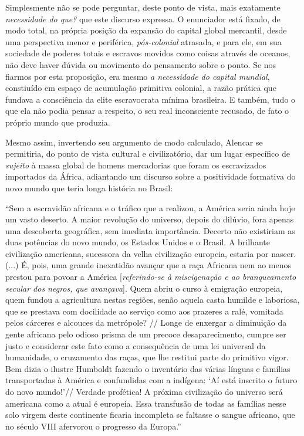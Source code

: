 Simplesmente não se pode perguntar, deste ponto de vista, mais
exatamente \emph{necessidade do que?} que este discurso expressa. O
enunciador está fixado, de modo total, na própria posição da expansão do
capital global mercantil, desde uma perspectiva menor e periférica,
\emph{pós-colonial} atrasada, e para ele, em sua sociedade de poderes
totais e escravos movidos como coisas através de oceanos, não deve haver
dúvida ou movimento do pensamento sobre o ponto. Se nos fiarmos por esta
proposição, era mesmo \emph{a necessidade do capital mundial},
constiuído em espaço de acumulação primitiva colonial, a razão prática
que fundava a consciência da elite escravocrata mínima brasileira. E
também, tudo o que ela não podia pensar a respeito, o seu real
inconsciente recusado, de fato o próprio mundo que produzia.

Mesmo assim, invertendo seu argumento de modo calculado, Alencar se
permitiria, do ponto de vista cultural e civilizatório, dar um lugar
específico de \emph{sujeito} à massa global de homens mercadorias que
foram os escravizados importados da África, adiantando um discurso sobre
a positividade formativa do novo mundo que teria longa história no
Brasil:

``Sem a escravidão africana e o tráfico que a realizou, a América seria
ainda hoje um vasto deserto. A maior revolução do universo, depois do
dilúvio, fora apenas uma descoberta geográfica, sem imediata
importância. Decerto não existiriam as duas potências do novo mundo, os
Estados Unidos e o Brasil. A brilhante civilização americana, sucessora
da velha civilização europeia, estaria por nascer. (...) É, pois, uma
grande inexatidão avançar que a raça Africana nem ao menos prestou para
povoar a América {[}\emph{referindo-se à miscigenação e ao branqueamento
secular dos negros, que avançava}{]}. Quem abriu o curso à emigração
europeia, quem fundou a agricultura nestas regiões, senão aquela casta
humilde e laboriosa, que se prestava com docilidade ao serviço como aos
prazeres a ralé, vomitada pelos cárceres e alcouces da metrópole? //
Longe de enxergar a diminuição da gente africana pelo odioso prisma de
um precoce desaparecimento, cumpre ser justo e considerar este fato como
a consequência de uma lei universal da humanidade, o cruzamento das
raças, que lhe restitui parte do primitivo vigor. Bem dizia o ilustre
Humboldt fazendo o inventário das várias línguas e famílias
transportadas à América e confundidas com a indígena: `Aí está inscrito
o futuro do novo mundo!'// Verdade profética! A próxima civilização do
universo será americana como a atual é europeia. Essa transfusão de
todas as famílias nesse solo virgem deste continente ficaria incompleta
se faltasse o sangue africano, que no século VIII afervorou o progresso
da Europa.''

